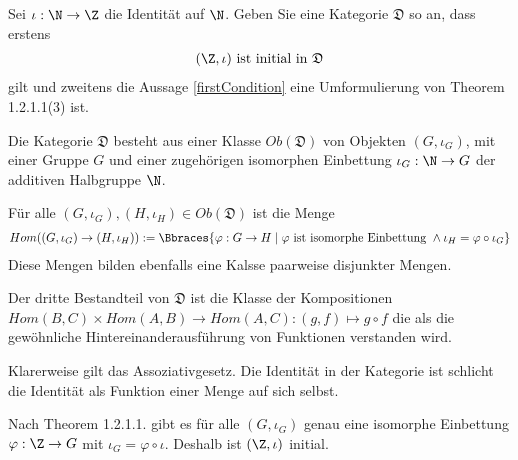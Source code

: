 \begin{exercise}
    Sei $\iota: \N \to \Z$ die Identität auf $\N$. Geben Sie eine Kategorie $\mathfrak{D}$ so an, dass erstens
    \begin{align}
        (\Z, \iota) \text{ ist initial in } \mathfrak{D} \label{firstCondition}
    \end{align}
    gilt und zweitens die Aussage \eqref{firstCondition} eine Umformulierung von Theorem 1.2.1.1(3) ist.
\end{exercise}

\begin{solution}
    Die Kategorie $\mathfrak{D}$ besteht aus einer Klasse $Ob(\mathfrak{D})$ von Objekten $(G, \iota_G)$, mit einer Gruppe $G$ und einer zugehörigen isomorphen Einbettung $\iota_G:\N \to G$ der additiven Halbgruppe $\N$. 
    
    Für alle $(G, \iota_G), (H, \iota_H) \in Ob(\mathfrak{D})$ ist die Menge 
    \begin{align*}
        Hom((G, \iota_G) \to (H, \iota_H)) := \Bbraces{\varphi:G \to H \mid \varphi \text{ ist isomorphe Einbettung } \land \iota_H = \varphi \circ \iota_G}
    \end{align*}
    Diese Mengen bilden ebenfalls eine Kalsse paarweise disjunkter Mengen. 
    
    Der dritte Bestandteil von $\mathfrak{D}$ ist die Klasse der Kompositionen $Hom(B,C) \times Hom(A,B) \to Hom(A,C): (g,f) \mapsto g \circ f$ die als die gewöhnliche Hintereinanderausführung von Funktionen verstanden wird. 

    Klarerweise gilt das Assoziativgesetz. Die Identität in der Kategorie ist schlicht die Identität als Funktion einer Menge auf sich selbst.

    Nach Theorem 1.2.1.1. gibt es für alle $(G, \iota_G)$ genau eine isomorphe Einbettung $\varphi:\Z \to G$ mit $\iota_G = \varphi \circ \iota$. Deshalb ist $(\Z, \iota)$ initial.
\end{solution}